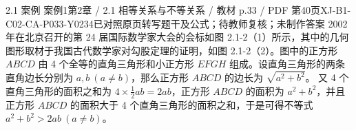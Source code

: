 \par\noindent\begin{minipage}{\linewidth}
\begin{bankitem}{2.1 案例 案例1}{第2章 / 2.1 相等关系与不等关系 / 教材 p.33 / PDF 第40页}{XJ-B1-C02-CA-P033-Y0234}{已对照原页转写题干及公式；待教师复核；未制作答案}
2002 年在北京召开的第 24 届国际数学家大会的会标如图 2.1-2（1）所示，其中的几何图形取材于我国古代数学家对勾股定理的证明，如图 2.1-2（2）。图中的正方形 $ABCD$ 由 4 个全等的直角三角形和小正方形 $EFGH$ 组成。设直角三角形的两条直角边长分别为 $a,b\ (a\ne b)$，那么正方形 $ABCD$ 的边长为 $\sqrt{a^2+b^2}$。
又 4 个直角三角形的面积之和为 $4\times\frac12ab=2ab$，正方形 $ABCD$ 的面积为 $a^2+b^2$，并且正方形 $ABCD$ 的面积大于 4 个直角三角形的面积之和，于是可得不等式 $a^2+b^2>2ab\ (a\ne b)$。
\end{bankitem}
\end{minipage}\par\medskip
